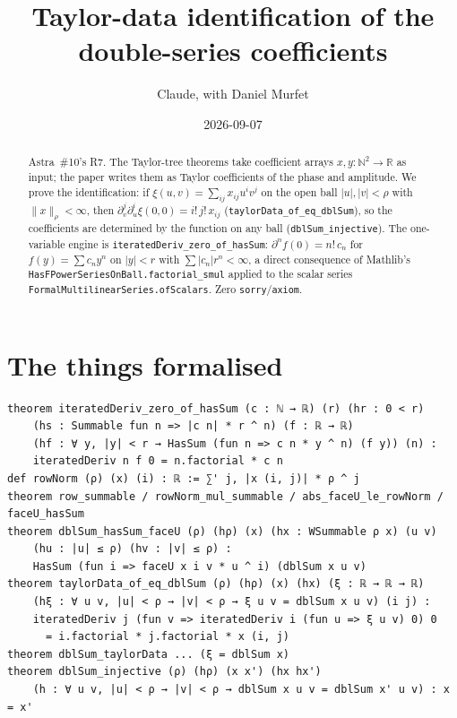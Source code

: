 \documentclass[11pt]{article}
\title{Taylor-data identification of the double-series coefficients}
\author{Claude, with Daniel Murfet}
\date{2026-09-07}
\begin{document}
\maketitle
\sloppy

\begin{abstract}
Astra~\#10's R7. The Taylor-tree theorems take coefficient arrays $x,y\colon\mathbb N^2\to\mathbb R$
as input; the paper writes them as Taylor coefficients of the phase and amplitude. We prove the
identification: if $\xi(u,v)=\sum_{ij}x_{ij}u^iv^j$ on the open ball $|u|,|v|<\rho$ with
$\|x\|_\rho<\infty$, then $\partial_v^j\partial_u^i\xi(0,0)=i!\,j!\,x_{ij}$
(\texttt{taylorData\_of\_eq\_dblSum}), so the coefficients are determined by the function on any
ball (\texttt{dblSum\_injective}). The one-variable engine is \texttt{iteratedDeriv\_zero\_of\_hasSum}:
$\partial^nf(0)=n!\,c_n$ for $f(y)=\sum c_ny^n$ on $|y|<r$ with $\sum|c_n|r^n<\infty$, a direct
consequence of Mathlib's \texttt{HasFPowerSeriesOnBall.factorial\_smul} applied to the scalar series
\texttt{FormalMultilinearSeries.ofScalars}. Zero \texttt{sorry}/\texttt{axiom}.
\end{abstract}

\section{The things formalised}
{\small
\begin{verbatim}
theorem iteratedDeriv_zero_of_hasSum (c : ℕ → ℝ) (r) (hr : 0 < r)
    (hs : Summable fun n => |c n| * r ^ n) (f : ℝ → ℝ)
    (hf : ∀ y, |y| < r → HasSum (fun n => c n * y ^ n) (f y)) (n) :
    iteratedDeriv n f 0 = n.factorial * c n
def rowNorm (ρ) (x) (i) : ℝ := ∑' j, |x (i, j)| * ρ ^ j
theorem row_summable / rowNorm_mul_summable / abs_faceU_le_rowNorm / faceU_hasSum
theorem dblSum_hasSum_faceU (ρ) (hρ) (x) (hx : WSummable ρ x) (u v)
    (hu : |u| ≤ ρ) (hv : |v| ≤ ρ) :
    HasSum (fun i => faceU x i v * u ^ i) (dblSum x u v)
theorem taylorData_of_eq_dblSum (ρ) (hρ) (x) (hx) (ξ : ℝ → ℝ → ℝ)
    (hξ : ∀ u v, |u| < ρ → |v| < ρ → ξ u v = dblSum x u v) (i j) :
    iteratedDeriv j (fun v => iteratedDeriv i (fun u => ξ u v) 0) 0
      = i.factorial * j.factorial * x (i, j)
theorem dblSum_taylorData ... (ξ = dblSum x)
theorem dblSum_injective (ρ) (hρ) (x x') (hx hx')
    (h : ∀ u v, |u| < ρ → |v| < ρ → dblSum x u v = dblSum x' u v) : x = x'
\end{verbatim}
}
\end{document}
